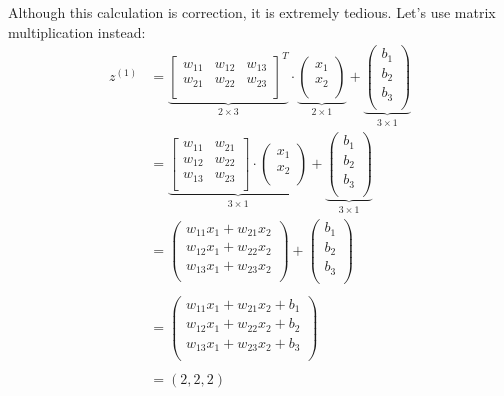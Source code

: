 \documentclass{article}
\begin{document}
Although this calculation is correction, it is extremely tedious. Let's use matrix multiplication instead:
\begin{align*}
    z^{(1)} &= 
    \underbrace{
    \begin{bmatrix}
        w_{11} & w_{12} & w_{13} \\
        w_{21} & w_{22} & w_{23} \\
    \end{bmatrix}^T
    }_{2\times 3}
    \cdot
    \underbrace{
    \begin{pmatrix}
        x_1 \\
        x_2 \\
    \end{pmatrix}
    }_{2\times 1}
    +
    \underbrace{
    \begin{pmatrix}
        b_1 \\
        b_2 \\
        b_3 \\
    \end{pmatrix}
    }_{3\times 1}\\
    &=
    \underbrace{
    \begin{bmatrix}
    w_{11} & w_{21} \\
    w_{12} & w_{22} \\
    w_{13} & w_{23} \\
    \end{bmatrix}
    \cdot
    \begin{pmatrix}
        x_1 \\
        x_2 \\
    \end{pmatrix}
    }_{3\times 1}
    +
    \underbrace{
    \begin{pmatrix}
        b_1 \\
        b_2 \\
        b_3 \\
    \end{pmatrix}
    }_{3\times 1}\\
    &=
    \begin{pmatrix}
        w_{11}x_1 + w_{21}x_2\\
        w_{12}x_1 + w_{22}x_2\\
        w_{13}x_1 + w_{23}x_2\\
    \end{pmatrix}
    +
    \begin{pmatrix}
        b_1\\
        b_2\\
        b_3\\
    \end{pmatrix}\\ \\
    &=
    \begin{pmatrix}
        w_{11}x_1 + w_{21}x_2+b_1\\
        w_{12}x_1 + w_{22}x_2+b_2\\
        w_{13}x_1 + w_{23}x_2+b_3\\
    \end{pmatrix}\\ \\
    &=(2,2,2)
\end{align*}
\end{document}
